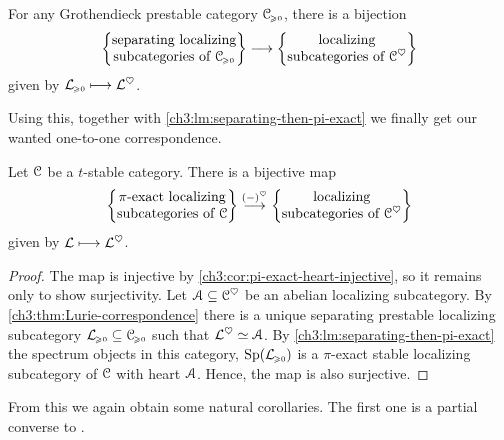 \begin{theorem}
    \label{ch3:thm:Lurie-correspondence}
    For any Grothendieck prestable category $\C\geqz$, there is a bijection 
    \[\separating \to \ablocalizing\]
    given by $\L\geqz\longmapsto \L^\heart$. 
\end{theorem}

Using this, together with \cref{ch3:lm:separating-then-pi-exact} we finally get our wanted one-to-one correspondence. 

\begin{theorem}
    \label{ch3:thm:main}
    Let $\C$ be a $t$-stable category. There is a bijective map
    \[\piexact\overset{(-)^\heart}\to \ablocalizing\]
    given by $\L\longmapsto \L^\heart$. 
\end{theorem}
\begin{proof}
    The map is injective by \cref{ch3:cor:pi-exact-heart-injective}, so it remains only to show surjectivity. Let $\A\subseteq \C^\heart$ be an abelian localizing subcategory. By \cref{ch3:thm:Lurie-correspondence} there is a unique separating prestable localizing subcategory $\L\geqz \subseteq \C\geqz$ such that $\L^\heart \simeq \A$. By \cref{ch3:lm:separating-then-pi-exact} the spectrum objects in this category, $\Sp(\L\geqz)$ is a $\pi$-exact stable localizing subcategory of $\C$ with heart $\A$. Hence, the map is also surjective. 
\end{proof}


From this we again obtain some natural corollaries. The first one is a partial converse to \cite[2.13]{takahashi_2009}.

